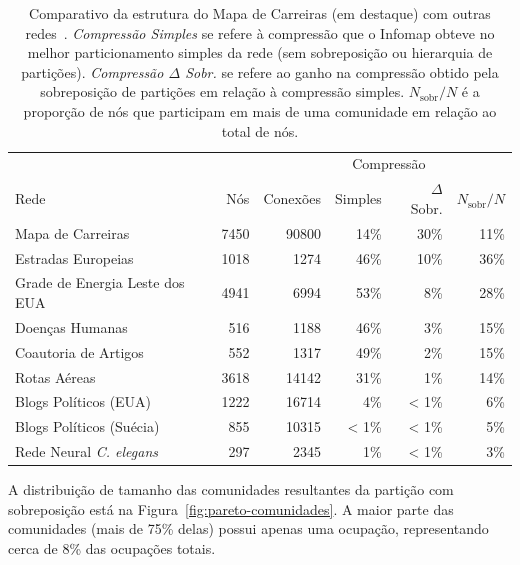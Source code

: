 \documentclass[
  article,
  11pt,
  a4paper,
  english,
  brazil,
  sumario=tradicional]{abntex2}
\begin{document}
\begin{table}
  \centering
  \begin{tabular}{@{} l r r r r r @{}}
    \toprule
                                           &      &          & \multicolumn{2}{c}{Compressão} & \\
    \cmidrule(r){4-5}
    Rede                                   & Nós  & Conexões & Simples & $\Delta$ Sobr.       & $N_{\text{sobr}}/N$ \\
    \midrule
    \rowcolor{yellow!25} Mapa de Carreiras & 7450 & 90800    & 14\%    & 30\%                 & 11\% \\
    Estradas Europeias                     & 1018 & 1274     & 46\%    & 10\%                 & 36\% \\
    Grade de Energia Leste dos EUA         & 4941 & 6994     & 53\%    & 8\%                  & 28\% \\
    Doenças Humanas                        & 516  & 1188     & 46\%    & 3\%                  & 15\% \\
    Coautoria de Artigos                   & 552  & 1317     & 49\%    & 2\%                  & 15\% \\
    Rotas Aéreas                           & 3618 & 14142    & 31\%    & 1\%                  & 14\% \\
    Blogs Políticos (EUA)                  & 1222 & 16714    & 4\%     & < 1\%                & 6\% \\
    Blogs Políticos (Suécia)               & 855  & 10315    & < 1\%   & < 1\%                & 5\% \\
    Rede Neural \textit{C. elegans}        & 297  & 2345     & 1\%     & < 1\%                & 3\% \\
    \bottomrule
  \end{tabular}
  \caption{Comparativo da estrutura do Mapa de Carreiras (em destaque) com outras redes~\cite{Viamontes_Esquivel2011-it}. \textit{Compressão Simples} se refere à compressão que o Infomap obteve no melhor particionamento simples da rede (sem sobreposição ou hierarquia de partições). \textit{Compressão $\Delta$ Sobr.} se refere ao ganho na compressão obtido pela sobreposição de partições em relação à compressão simples. $N_{\text{sobr}}/N$ é a proporção de nós que participam em mais de uma comunidade em relação ao total de nós.}
  \label{tab:comparativo}
\end{table}

A distribuição de tamanho das comunidades resultantes da partição com sobreposição está na Figura~\ref{fig:pareto-comunidades}. A maior parte das comunidades (mais de 75\% delas) possui apenas uma ocupação, representando cerca de 8\% das ocupações totais.
\end{document}
